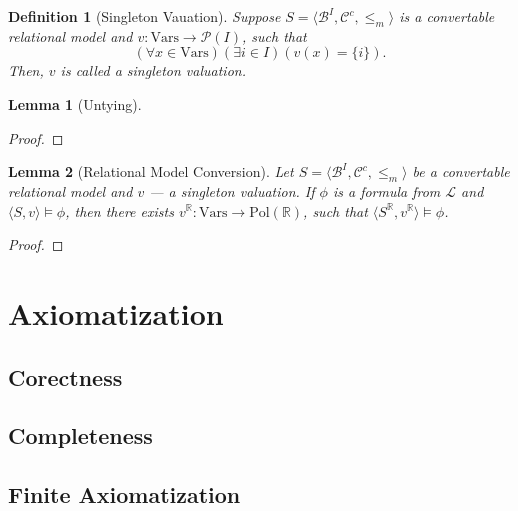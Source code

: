 \documentclass{article}
\newtheorem*{definition}{Definition}
\newtheorem*{lemma}{Lemma}
\newcommand{\R}{\mathbb{R}}
\newcommand{\pwrset}{\mathcal{P}}
\newcommand{\B}{\mathcal{B}}
\newcommand{\lang}{\mathcal{L}}
\newcommand{\Vars}{\text{Vars}}
\newcommand{\Pol}{\text{Pol}}
\begin{document}
\begin{definition}[Singleton Vauation]
  Suppose $S = \langle \B^I, \mathcal{C}^c, \leq_m \rangle$ is a convertable relational model and $v: \Vars \rightarrow \pwrset(I)$, such that
\begin{equation*}
(\forall x \in \Vars)(\exists i \in I)(v(x) = \{i\}).
\end{equation*}
Then, $v$ is called a \emph{singleton valuation}.
\end{definition}

\begin{lemma}[Untying]
\end{lemma}
\begin{proof}
\end{proof}

\begin{lemma}[Relational Model Conversion]
  Let $S = \langle \B^I, \mathcal{C}^c, \leq_m \rangle$ be a convertable relational model and $v$ --- a singleton valuation. If $\phi$ is a formula from $\lang$ and $\langle S, v \rangle \models \phi$, then there exists $v^\R: \Vars \rightarrow \Pol(\R)$, such that $\langle S^\R, v^\R \rangle \models \phi$.
\end{lemma}
\begin{proof}
\end{proof}
\section{Axiomatization}
\subsection{Corectness}
\subsection{Completeness}
\subsection{Finite Axiomatization}
\end{document}
